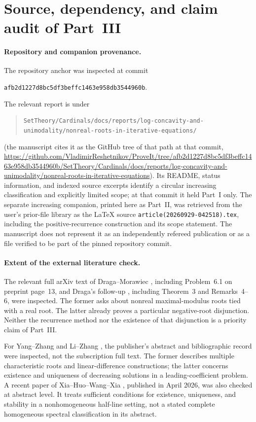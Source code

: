 \documentclass[11pt,letterpaper]{article}
\theoremstyle{definition}
\theoremstyle{remark}
\begin{document}
\section{Source, dependency, and claim audit of Part~III}
\label{nrr:dc:sec:audit}

\paragraph{Repository and companion provenance.}
The repository anchor was inspected at commit
\begin{center}\small
\texttt{afb2d1227d8bc5df3beffc1463e958db3544960b}.
\end{center}
The relevant report is under
\begin{quote}\small\raggedright
\nolinkurl{SetTheory/Cardinals/docs/reports/log-concavity-and-unimodality/nonreal-roots-in-iterative-equations/}
\end{quote}
(the manuscript cites it as the GitHub tree of that path at that commit,
\url{https://github.com/VladimirReshetnikov/ProveIt/tree/afb2d1227d8bc5df3beffc1463e958db3544960b/SetTheory/Cardinals/docs/reports/log-concavity-and-unimodality/nonreal-roots-in-iterative-equations}).
Its README, status information, and indexed source excerpts identify
a circular increasing classification and explicitly limited scope; at that
commit it held Part~I only. The separate increasing companion, printed here
as Part~II, was retrieved from the user's prior-file library as the LaTeX
source \nolinkurl{article(20260929-042518).tex}, including the
positive-recurrence construction and its scope statement. The manuscript
does not represent it as an independently refereed publication or as a file
verified to be part of the pinned repository commit.

\paragraph{Extent of the external literature check.}
The relevant full arXiv text of Draga--Morawiec \cite{DM2016}, including
Problem~6.1 on preprint page~13, and Draga's follow-up \cite{D2016},
including Theorem~3 and Remarks~4--6, were inspected. The former asks
about nonreal maximal-modulus roots tied with a real root. The latter
already proves a particular negative-root disjunction. Neither the
recurrence method nor the existence of that disjunction is a priority
claim of Part~III.

For Yang--Zhang \cite{YZ2004} and Li--Zhang \cite{LZ2013}, the
publisher's abstract and bibliographic record were inspected, not the
subscription full text. The former describes multiple characteristic
roots and linear-difference constructions; the latter concerns
existence and uniqueness of decreasing solutions in a leading-coefficient
problem. A recent paper of Xia--Huo--Wang--Xia \cite{XHWX2026}, published
in April 2026, was also checked at abstract level. It treats sufficient
conditions for existence, uniqueness, and stability in a nonhomogeneous
half-line setting, not a stated complete homogeneous spectral
classification in its abstract.
\end{document}
